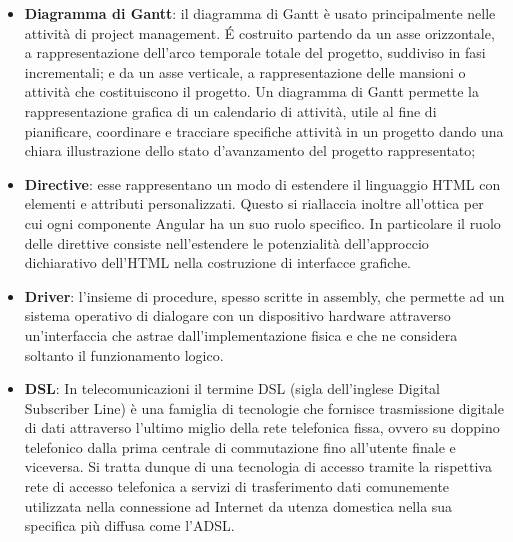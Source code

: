 \begin{itemize}
\begin{itemize}
 	\item Device file: un'interfaccia ad un driver che appare nel file system come se fosse un file ordinario; anch'essi sono divisi storicamente in block e character.
	\end{itemize}
	\item
	\textbf{Diagramma di Gantt}: il diagramma di Gantt è usato principalmente nelle attività di project management. \'E costruito partendo da un asse orizzontale, a rappresentazione dell'arco temporale totale del progetto, suddiviso in fasi incrementali; e da un asse verticale, a rappresentazione delle mansioni o attività che costituiscono il progetto.
	Un diagramma di Gantt permette la rappresentazione grafica di un calendario di attività, utile al fine di pianificare, coordinare e tracciare specifiche attività in un progetto dando una chiara illustrazione dello stato d'avanzamento del progetto rappresentato;
	\item
	\textbf{Directive}: esse rappresentano un modo di estendere il linguaggio HTML con elementi e attributi personalizzati. Questo si riallaccia inoltre all’ottica per cui ogni componente Angular ha un suo ruolo specifico. In particolare il ruolo delle direttive consiste nell’estendere le potenzialità dell’approccio dichiarativo dell’HTML nella costruzione di interfacce grafiche.
	\item
	\textbf{Driver}: l'insieme di procedure, spesso scritte in assembly, che permette ad un sistema operativo di dialogare con un dispositivo hardware attraverso un'interfaccia che astrae dall'implementazione fisica e che ne considera soltanto il funzionamento logico.
	\item
	\textbf{DSL}: In telecomunicazioni il termine DSL (sigla dell'inglese Digital Subscriber Line) è una famiglia di tecnologie che fornisce trasmissione digitale di dati attraverso l'ultimo miglio della rete telefonica fissa, ovvero su doppino telefonico dalla prima centrale di commutazione fino all'utente finale e viceversa.
	Si tratta dunque di una tecnologia di accesso tramite la rispettiva rete di accesso telefonica a servizi di trasferimento dati comunemente utilizzata nella connessione ad Internet da utenza domestica nella sua specifica più diffusa come l'ADSL. 
\end{itemize}